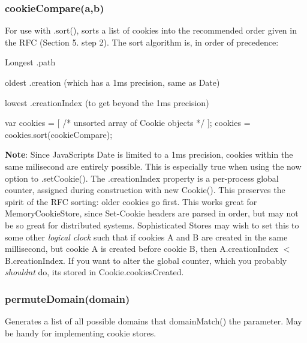 \subsubsection*{{\ttfamily cookie\+Compare(a,b)}}

For use with {\ttfamily .sort()}, sorts a list of cookies into the recommended order given in the R\+FC (Section 5. step 2). The sort algorithm is, in order of precedence\+:


\begin{DoxyItemize}
\item Longest {\ttfamily .path}
\item oldest {\ttfamily .creation} (which has a 1ms precision, same as {\ttfamily Date})
\item lowest {\ttfamily .creation\+Index} (to get beyond the 1ms precision)
\end{DoxyItemize}


\begin{DoxyCode}
var cookies = [ /* unsorted array of Cookie objects */ ];
cookies = cookies.sort(cookieCompare);
\end{DoxyCode}


{\bfseries Note}\+: Since Java\+Script\textquotesingle{}s {\ttfamily Date} is limited to a 1ms precision, cookies within the same milisecond are entirely possible. This is especially true when using the {\ttfamily now} option to {\ttfamily .set\+Cookie()}. The {\ttfamily .creation\+Index} property is a per-\/process global counter, assigned during construction with {\ttfamily new Cookie()}. This preserves the spirit of the R\+FC sorting\+: older cookies go first. This works great for {\ttfamily Memory\+Cookie\+Store}, since {\ttfamily Set-\/\+Cookie} headers are parsed in order, but may not be so great for distributed systems. Sophisticated {\ttfamily Store}s may wish to set this to some other {\itshape logical clock} such that if cookies A and B are created in the same millisecond, but cookie A is created before cookie B, then {\ttfamily A.\+creation\+Index $<$ B.\+creation\+Index}. If you want to alter the global counter, which you probably {\itshape shouldn\textquotesingle{}t} do, it\textquotesingle{}s stored in {\ttfamily Cookie.\+cookies\+Created}.

\subsubsection*{{\ttfamily permute\+Domain(domain)}}

Generates a list of all possible domains that {\ttfamily domain\+Match()} the parameter. May be handy for implementing cookie stores.

